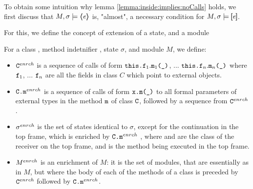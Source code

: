 \documentclass[acmsmall,review,anonymous,screen]{acmart}\settopmatter{printfolios=true,printacmref=false}
\begin{document}
{To obtain some intuition why lemma \ref{lemma:inside:implies:noCalls} holds, we first discuss that $M , \sigma \models \langle\!\!\langle \mathit{e} \rangle\!\!\rangle $ is, 
"almost",  a necessary condition for $M , \sigma \models [\!\![ \mathit{e} ]\!\!] $. 

For this, we define the concept of extension of a state, and a module

\begin{definition}
For a class , method indetnifier , state $\sigma$, and module $M$, we define:

\begin{itemize}

\item
${\mbox{\normalfont{\texttt{C}}}^{enrch}}$ is a sequence of calls of form $\mbox{\normalfont{\texttt{this.f}}}_1.\mbox{\normalfont{\texttt{m}}}_1\mbox{\normalfont{\texttt{(\_)}}}$, ... $\mbox{\normalfont{\texttt{this.f}}}_n.\mbox{\normalfont{\texttt{m}}}_n\mbox{\normalfont{\texttt{(\_)}}}$  where $\mbox{\normalfont{\texttt{f}}}_1$, ... $\mbox{\normalfont{\texttt{f}}}_n$  are all the fields in class $C$ which point to external objects.

\item 
${\mbox{\normalfont{\texttt{C.m}}}^{enrch}}$ is a sequence of calls of form $\mbox{\normalfont{\texttt{x.m(\_)}}}$  to all  formal parameters of external types in the method $\mbox{\normalfont{\texttt{m}}}$ of class  $\mbox{\normalfont{\texttt{C}}}$, followed by a sequence from ${\mbox{\normalfont{\texttt{C}}}^{enrch}}$.

 \item
  ${\sigma^{enrch}}$   is  the set of  states identical to $\sigma$, except for the continuation in the top frame, which is enriched by 
 ${\mbox{\normalfont{\texttt{C.m}}}^{enrch}}$ , where  and  are the class  of the receiver on the top frame, and  is the method being executed in the top frame. 
\item
${M^{enrch}}$ is an enrichment of $M$: 
it is the set of modules, that are essentially as in $M$, but where 
the body of each of the methods  of a class  is preceded by ${\mbox{\normalfont{\texttt{C}}}^{enrch}}$  followed by ${\mbox{\normalfont{\texttt{C.m}}}^{enrch}}$.
\end{itemize}
\end{definition}

}
\end{document}
